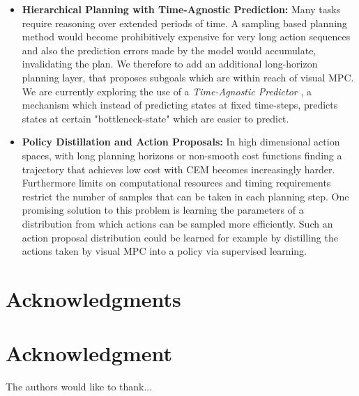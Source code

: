 \documentclass[10pt,journal,compsoc]{IEEEtran}
\begin{document}
\begin{itemize}
	\item \textbf{Hierarchical Planning with Time-Agnostic Prediction:} Many tasks require reasoning over extended periods of time. 
	A sampling based planning method would become prohibitively expensive for very long action sequences and also the prediction errors made by the model would accumulate, invalidating the plan. We therefore to add an additional long-horizon planning layer, that proposes subgoals which are within reach of visual MPC. We are currently exploring the use of a \emph{Time-Agnostic Predictor} \cite{jayaraman2018time}, a mechanism which instead of predicting states at fixed time-steps, predicts states at certain "bottleneck-state" which are easier to predict.
	\item \textbf{Policy Distillation and Action Proposals:} In high dimensional action spaces, with long planning horizons or non-smooth cost functions finding a trajectory that achieves low cost with CEM becomes increasingly harder. Furthermore limits on computational resources and timing requirements restrict the number of samples that can be taken in each planning step. One promising solution to this problem is learning the parameters of a distribution from which actions can be sampled more efficiently. Such an action proposal distribution could be learned for example by distilling the actions taken by visual MPC into a policy via supervised learning.
\end{itemize}







\ifCLASSOPTIONcompsoc
  \section*{Acknowledgments}
\else
  \section*{Acknowledgment}
\fi


The authors would like to thank...


\ifCLASSOPTIONcaptionsoff
  \newpage
\fi
\end{document}
